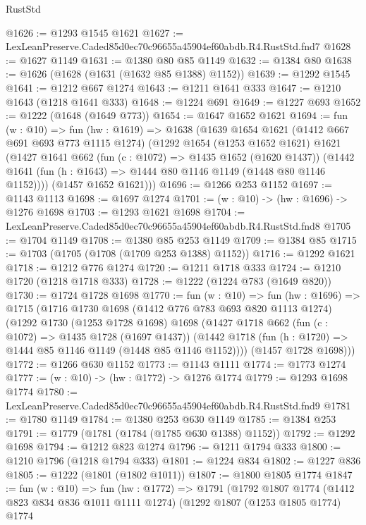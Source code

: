 \begin{lexlean}{RustStd}
\begin{coremodule}
@1626 := @1293 @1545 @1621
@1627 := LexLeanPreserve.Caded85d0ec70c96655a45904ef60abdb.R4.RustStd.fnd7
@1628 := @1627 @1149
@1631 := @1380 @80 @85 @1149
@1632 := @1384 @80
@1638 := @1626 (@1628 (@1631 (@1632 @85 @1388) @1152))
@1639 := @1292 @1545
@1641 := @1212 @667 @1274
@1643 := @1211 @1641 @333
@1647 := @1210 @1643 (@1218 @1641 @333)
@1648 := @1224 @691
@1649 := @1227 @693
@1652 := @1222 (@1648 (@1649 @773))
@1654 := @1647 @1652 @1621
@1694 := fun (w : @10) =>
  fun (hw : @1619) =>
  @1638
    (@1639
      @1654
      @1621
      (@1412 @667 @691 @693 @773 @1115 @1274)
      (@1292
        @1654
        (@1253 @1652 @1621)
        @1621
        (@1427
          @1641
          @662
          (fun (c : @1072) => @1435 @1652 (@1620 @1437))
          (@1442 @1641 (fun (h : @1643) => @1444 @80 @1146 @1149 (@1448 @80 @1146 @1152))))
        (@1457 @1652 @1621)))
@1696 := @1266 @253 @1152
@1697 := @1143 @1113
@1698 := @1697 @1274
@1701 := (w : @10) -> (hw : @1696) -> @1276 @1698
@1703 := @1293 @1621 @1698
@1704 := LexLeanPreserve.Caded85d0ec70c96655a45904ef60abdb.R4.RustStd.fnd8
@1705 := @1704 @1149
@1708 := @1380 @85 @253 @1149
@1709 := @1384 @85
@1715 := @1703 (@1705 (@1708 (@1709 @253 @1388) @1152))
@1716 := @1292 @1621
@1718 := @1212 @776 @1274
@1720 := @1211 @1718 @333
@1724 := @1210 @1720 (@1218 @1718 @333)
@1728 := @1222 (@1224 @783 (@1649 @820))
@1730 := @1724 @1728 @1698
@1770 := fun (w : @10) =>
  fun (hw : @1696) =>
  @1715
    (@1716
      @1730
      @1698
      (@1412 @776 @783 @693 @820 @1113 @1274)
      (@1292
        @1730
        (@1253 @1728 @1698)
        @1698
        (@1427
          @1718
          @662
          (fun (c : @1072) => @1435 @1728 (@1697 @1437))
          (@1442 @1718 (fun (h : @1720) => @1444 @85 @1146 @1149 (@1448 @85 @1146 @1152))))
        (@1457 @1728 @1698)))
@1772 := @1266 @630 @1152
@1773 := @1143 @1111
@1774 := @1773 @1274
@1777 := (w : @10) -> (hw : @1772) -> @1276 @1774
@1779 := @1293 @1698 @1774
@1780 := LexLeanPreserve.Caded85d0ec70c96655a45904ef60abdb.R4.RustStd.fnd9
@1781 := @1780 @1149
@1784 := @1380 @253 @630 @1149
@1785 := @1384 @253
@1791 := @1779 (@1781 (@1784 (@1785 @630 @1388) @1152))
@1792 := @1292 @1698
@1794 := @1212 @823 @1274
@1796 := @1211 @1794 @333
@1800 := @1210 @1796 (@1218 @1794 @333)
@1801 := @1224 @834
@1802 := @1227 @836
@1805 := @1222 (@1801 (@1802 @1011))
@1807 := @1800 @1805 @1774
@1847 := fun (w : @10) =>
  fun (hw : @1772) =>
  @1791
    (@1792
      @1807
      @1774
      (@1412 @823 @834 @836 @1011 @1111 @1274)
      (@1292
        @1807
        (@1253 @1805 @1774)
        @1774

\end{coremodule}
\end{lexlean}
